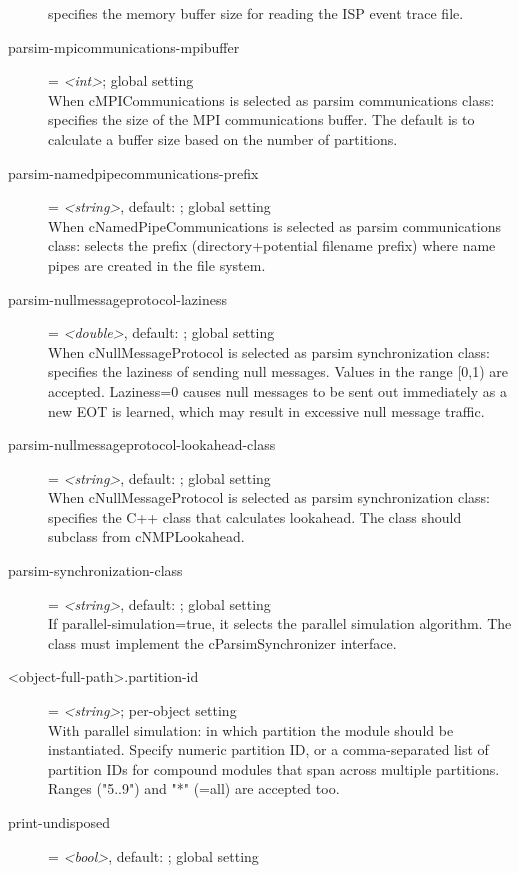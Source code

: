 \begin{description}
    specifies the memory buffer size for reading the ISP event trace file.
\item[parsim-mpicommunications-mpibuffer] = \textit{<int>}; global setting \\
    When cMPICommunications is selected as parsim communications class:
    specifies the size of the MPI communications buffer. The default is to
    calculate a buffer size based on the number of partitions.
\item[parsim-namedpipecommunications-prefix] = \textit{<string>}, default: ; global setting \\
    When cNamedPipeCommunications is selected as parsim communications class:
    selects the prefix (directory+potential filename prefix) where name pipes
    are created in the file system.
\item[parsim-nullmessageprotocol-laziness] = \textit{<double>}, default: ; global setting \\
    When cNullMessageProtocol is selected as parsim synchronization class:
    specifies the laziness of sending null messages. Values in the range [0,1)
    are accepted. Laziness=0 causes null messages to be sent out immediately as
    a new EOT is learned, which may result in excessive null message traffic.
\item[parsim-nullmessageprotocol-lookahead-class] = \textit{<string>}, default: ; global setting \\
    When cNullMessageProtocol is selected as parsim synchronization class:
    specifies the C++ class that calculates lookahead. The class should
    subclass from cNMPLookahead.
\item[parsim-synchronization-class] = \textit{<string>}, default: ; global setting \\
    If parallel-simulation=true, it selects the parallel simulation algorithm.
    The class must implement the cParsimSynchronizer interface.
\item[<object-full-path>.partition-id] = \textit{<string>}; per-object setting \\
    With parallel simulation: in which partition the module should be
    instantiated. Specify numeric partition ID, or a comma-separated list of
    partition IDs for compound modules that span across multiple partitions.
    Ranges ("5..9") and "*" (=all) are accepted too.
\item[print-undisposed] = \textit{<bool>}, default: ; global setting \\

\end{description}
